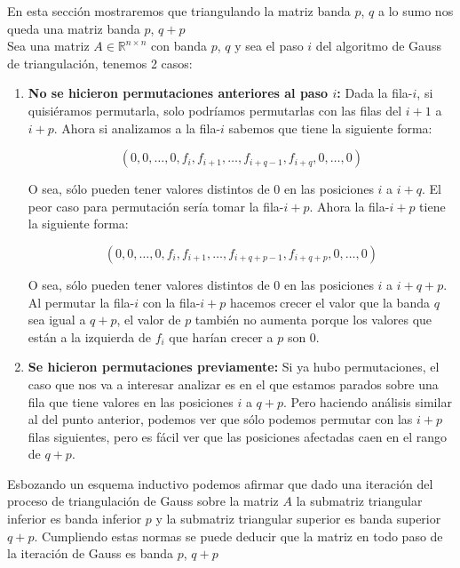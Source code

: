 En esta sección mostraremos que triangulando la matriz banda $p$, $q$ a lo sumo nos queda una matriz banda $p$, $q + p$\\

Sea una matriz $A \in \mathbb{R}^{n \times n}$ con banda $p$, $q$ y sea el paso $i$ del algoritmo de Gauss de triangulación, tenemos 2 casos:

\begin{enumerate}
    \item {\bf No se hicieron permutaciones anteriores al paso $i$:} Dada la fila-$i$, si quisiéramos permutarla, solo podríamos permutarlas con las filas del $i + 1$ a $i + p$. Ahora si analizamos a la fila-$i$ sabemos que tiene la siguiente forma:

    \begin{displaymath}
        (0, 0, \dots, 0, f_i, f_{i + 1}, \dots, f_{i + q - 1}, f_{i + q}, 0, \dots, 0)
    \end{displaymath}

    O sea, sólo pueden tener valores distintos de $0$ en las posiciones $i$ a $i + q$. El peor caso para permutación sería tomar la fila-${i + p}$. Ahora la fila-${i + p}$ tiene la siguiente forma:

    \begin{displaymath}
        (0, 0, \dots, 0, f_i, f_{i + 1}, \dots, f_{i + q + p - 1}, f_{i + q + p}, 0, \dots, 0)
    \end{displaymath}

    O sea, sólo pueden tener valores distintos de $0$ en las posiciones $i$ a $i + q + p$. Al permutar la fila-$i$ con la fila-${i + p}$ hacemos crecer el valor que la banda $q$ sea igual a $q + p$, el valor de $p$ también no aumenta porque los valores que están a la izquierda de $f_i$ que harían crecer a $p$ son 0.

    \item {\bf Se hicieron permutaciones previamente:} Si ya hubo permutaciones, el caso que nos va a interesar analizar es en el que estamos parados sobre una fila que tiene valores en las posiciones $i$ a $q + p$. Pero haciendo análisis similar al del punto anterior, podemos ver que sólo podemos permutar con las $i + p$ filas siguientes, pero es fácil ver que las posiciones afectadas caen en el rango de $q + p$.
\end{enumerate}

Esbozando un esquema inductivo podemos afirmar que dado una iteración del proceso de triangulación de Gauss sobre la matriz $A$ la submatriz triangular inferior es banda inferior $p$ y la submatriz triangular superior es banda superior $q + p$. Cumpliendo estas normas se puede deducir que la matriz en todo paso de la iteración de Gauss es banda $p$, $q + p$

